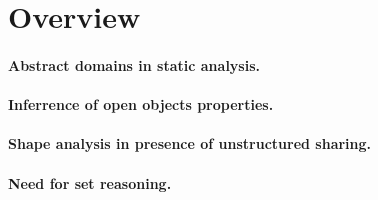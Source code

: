 \section{Overview}
\label{s:2:over}

\paragraph{Abstract domains in static analysis.} %

\paragraph{Inferrence of open objects properties.}
\cite{hoo:14:sas}

\paragraph{Shape analysis in presence of unstructured sharing.}
\cite{memcad:15:sas}

\paragraph{Need for set reasoning.}
